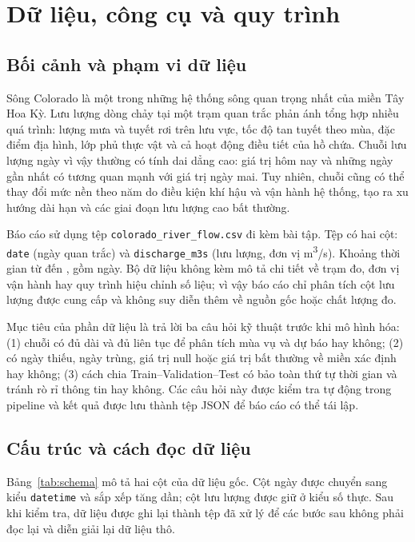 \section{Dữ liệu, công cụ và quy trình}
\label{sec:data}

\subsection{Bối cảnh và phạm vi dữ liệu}

Sông Colorado là một trong những hệ thống sông quan trọng nhất của miền Tây Hoa Kỳ.
Lưu lượng dòng chảy tại một trạm quan trắc phản ánh tổng hợp nhiều quá trình: lượng
mưa và tuyết rơi trên lưu vực, tốc độ tan tuyết theo mùa, đặc điểm địa hình, lớp phủ
thực vật và cả hoạt động điều tiết của hồ chứa. Chuỗi lưu lượng ngày vì vậy thường
có tính dai dẳng cao: giá trị hôm nay và những ngày gần nhất có tương quan mạnh với
giá trị ngày mai. Tuy nhiên, chuỗi cũng có thể thay đổi mức nền theo năm do điều kiện
khí hậu và vận hành hệ thống, tạo ra xu hướng dài hạn và các giai đoạn lưu lượng cao
bất thường.

Báo cáo sử dụng tệp \texttt{colorado\_river\_flow.csv} đi kèm bài tập. Tệp có hai cột:
\texttt{date} (ngày quan trắc) và \texttt{discharge\_m3s} (lưu lượng, đơn vị
m\textsuperscript{3}/s). Khoảng thời gian từ \DateMin{} đến \DateMax{}, gồm
\DatasetN{} ngày. Bộ dữ liệu không kèm mô tả chi tiết về trạm đo, đơn vị vận hành
hay quy trình hiệu chỉnh số liệu; vì vậy báo cáo chỉ phân tích cột lưu lượng được
cung cấp và không suy diễn thêm về nguồn gốc hoặc chất lượng đo.

Mục tiêu của phần dữ liệu là trả lời ba câu hỏi kỹ thuật trước khi mô hình hóa:
(1) chuỗi có đủ dài và đủ liên tục để phân tích mùa vụ và dự báo hay không;
(2) có ngày thiếu, ngày trùng, giá trị null hoặc giá trị bất thường về miền xác định
hay không; (3) cách chia Train--Validation--Test có bảo toàn thứ tự thời gian và
tránh rò rỉ thông tin hay không. Các câu hỏi này được kiểm tra tự động trong pipeline
và kết quả được lưu thành tệp JSON để báo cáo có thể tái lập.

\subsection{Cấu trúc và cách đọc dữ liệu}

Bảng~\ref{tab:schema} mô tả hai cột của dữ liệu gốc. Cột ngày được chuyển sang kiểu
\texttt{datetime} và sắp xếp tăng dần; cột lưu lượng được giữ ở kiểu số thực. Sau khi
kiểm tra, dữ liệu được ghi lại thành tệp đã xử lý để các bước sau không phải đọc lại
và diễn giải lại dữ liệu thô.

